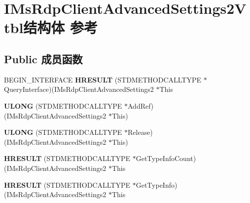 \hypertarget{struct_i_ms_rdp_client_advanced_settings2_vtbl}{}\section{I\+Ms\+Rdp\+Client\+Advanced\+Settings2\+Vtbl结构体 参考}
\label{struct_i_ms_rdp_client_advanced_settings2_vtbl}
\subsection*{Public 成员函数}
\begin{DoxyCompactItemize}
\item 
\mbox{\label{struct_i_ms_rdp_client_advanced_settings2_vtbl_a3f70e7882278796f5a08ded403f49b91}} 
B\+E\+G\+I\+N\+\_\+\+I\+N\+T\+E\+R\+F\+A\+CE {\bfseries H\+R\+E\+S\+U\+LT} (S\+T\+D\+M\+E\+T\+H\+O\+D\+C\+A\+L\+L\+T\+Y\+PE $\ast$Query\+Interface)(I\+Ms\+Rdp\+Client\+Advanced\+Settings2 $\ast$This
\item 
\mbox{\label{struct_i_ms_rdp_client_advanced_settings2_vtbl_aa5b56476694f18869219ccd3926c1238}} 
{\bfseries U\+L\+O\+NG} (S\+T\+D\+M\+E\+T\+H\+O\+D\+C\+A\+L\+L\+T\+Y\+PE $\ast$Add\+Ref)(I\+Ms\+Rdp\+Client\+Advanced\+Settings2 $\ast$This)
\item 
\mbox{\label{struct_i_ms_rdp_client_advanced_settings2_vtbl_a90aa0479fc0d9108bb025d4a6540b791}} 
{\bfseries U\+L\+O\+NG} (S\+T\+D\+M\+E\+T\+H\+O\+D\+C\+A\+L\+L\+T\+Y\+PE $\ast$Release)(I\+Ms\+Rdp\+Client\+Advanced\+Settings2 $\ast$This)
\item 
\mbox{\label{struct_i_ms_rdp_client_advanced_settings2_vtbl_a61ce76de03d4d9412c896eb1fa9ac86f}} 
{\bfseries H\+R\+E\+S\+U\+LT} (S\+T\+D\+M\+E\+T\+H\+O\+D\+C\+A\+L\+L\+T\+Y\+PE $\ast$Get\+Type\+Info\+Count)(I\+Ms\+Rdp\+Client\+Advanced\+Settings2 $\ast$This
\item 
\mbox{\label{struct_i_ms_rdp_client_advanced_settings2_vtbl_a8048d4ffd823d77c2343a725ed3c6792}} 
{\bfseries H\+R\+E\+S\+U\+LT} (S\+T\+D\+M\+E\+T\+H\+O\+D\+C\+A\+L\+L\+T\+Y\+PE $\ast$Get\+Type\+Info)(I\+Ms\+Rdp\+Client\+Advanced\+Settings2 $\ast$This

\end{DoxyCompactItemize}
